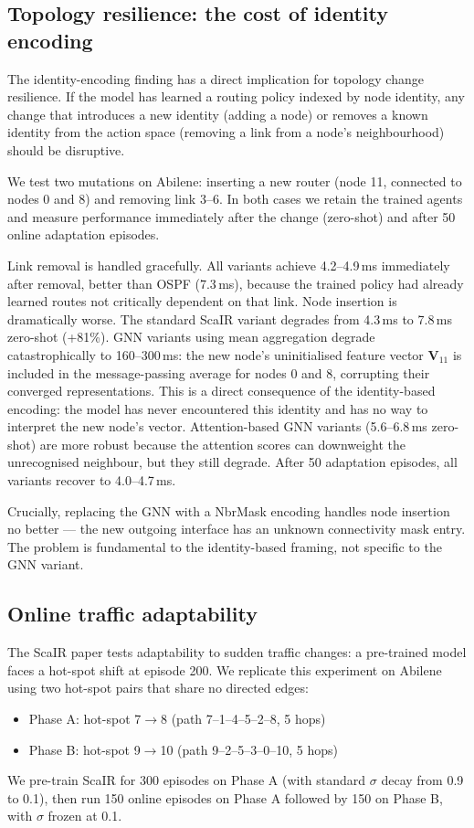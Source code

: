 \documentclass[10pt,twocolumn,letterpaper]{article}
\begin{document}
\subsection{Topology resilience: the cost of identity encoding}

The identity-encoding finding has a direct implication for topology
change resilience. If the model has learned a routing policy indexed by
node identity, any change that introduces a new identity (adding a node)
or removes a known identity from the action space (removing a link from
a node's neighbourhood) should be disruptive.

We test two mutations on Abilene: inserting a new router (node 11,
connected to nodes 0 and 8) and removing link 3--6. In both cases we
retain the trained agents and measure performance immediately after the
change (zero-shot) and after 50 online adaptation episodes.

Link removal is handled gracefully. All variants achieve 4.2--4.9\,ms
immediately after removal, better than OSPF (7.3\,ms), because the
trained policy had already learned routes not critically dependent on
that link. Node insertion is dramatically worse. The standard ScaIR
variant degrades from 4.3\,ms to 7.8\,ms zero-shot (+81\%). GNN
variants using mean aggregation degrade catastrophically to
160--300\,ms: the new node's uninitialised feature vector
$\mathbf{V}_{11}$ is included in the message-passing average for nodes
0 and 8, corrupting their converged representations. This is a direct
consequence of the identity-based encoding: the model has never
encountered this identity and has no way to interpret the new node's
vector. Attention-based GNN variants (5.6--6.8\,ms zero-shot) are more
robust because the attention scores can downweight the unrecognised
neighbour, but they still degrade. After 50 adaptation episodes, all
variants recover to 4.0--4.7\,ms.

Crucially, replacing the GNN with a NbrMask encoding handles node
insertion no better — the new outgoing interface has an unknown
connectivity mask entry. The problem is fundamental to the
identity-based framing, not specific to the GNN variant.

\subsection{Online traffic adaptability}

The ScaIR paper tests adaptability to sudden traffic changes: a
pre-trained model faces a hot-spot shift at episode 200. We replicate
this experiment on Abilene using two hot-spot pairs that share no
directed edges:
\begin{itemize}
  \item Phase A: hot-spot 7$\to$8 (path 7--1--4--5--2--8, 5 hops)
  \item Phase B: hot-spot 9$\to$10 (path 9--2--5--3--0--10, 5 hops)
\end{itemize}
We pre-train ScaIR for 300 episodes on Phase A (with standard $\sigma$
decay from 0.9 to 0.1), then run 150 online episodes on Phase A
followed by 150 on Phase B, with $\sigma$ frozen at 0.1.
\end{document}
